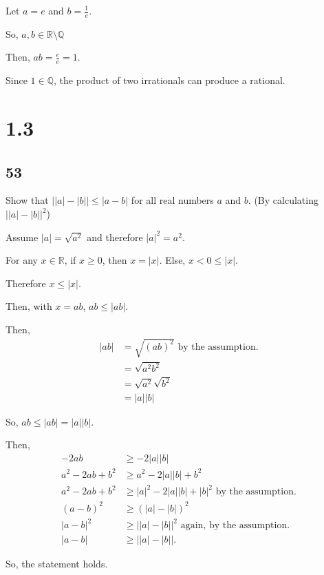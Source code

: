 \documentclass{article}
\begin{document}
\vspace{12pt}

Let $a = e$ and $b = \frac{1}{e}$.

So, $a, b \in \mathbb{R} \setminus \mathbb{Q}$

Then, $ab = \frac{e}{e} = 1$.

Since $1 \in \mathbb{Q}$, the product of two irrationals can produce a rational.



\section*{1.3}

\subsection*{53}
Show that $\bigl| |a|-|b| \bigr| \leq |a-b| $ for all real numbers $a$ and $b$. (By calculating $\bigl||a|-|b|\bigr|^2$)

Assume $|a| = \sqrt{a^2}$ and therefore $|a|^2 = a^2$.

For any $x \in \mathbb{R}$, if $x \geq 0$, then $x = |x|$. Else, $x < 0 \leq |x|$.

Therefore $x \leq |x|$.

Then, with $x = ab$, $ab \leq |ab|$.

Then, 
\begin{align*}
    |ab| &= \sqrt{{(ab)}^2} \text{ by the assumption.} \\
         &= \sqrt{{a}^2 {b}^2} \\
         &= \sqrt{a^2} \sqrt{b^2} \\
         &= |a||b|
\end{align*}

So, $ab \leq |ab| = |a||b|$.

Then,
\begin{align*}
    -2ab &\geq -2|a||b| \\
    a^2 - 2ab + b^2 &\geq a^2 - 2|a||b| + b^2 \\
    a^2 - 2ab + b^2 &\geq |a|^2 - 2|a||b| + |b|^2 \text{ by the assumption.} \\
    {(a - b)}^2 &\geq {(|a| - |b|)}^2 \\
    {|a - b|}^2 &\geq {\bigl| |a|-|b| \bigr|}^2 \text{ again, by the assumption.} \\
    |a - b| &\geq \bigl| |a|-|b| \bigr|.
\end{align*}

So, the statement holds.
\end{document}

